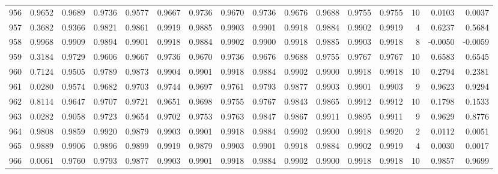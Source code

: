 \begin{tabular}{lrrrrrrrrrrrrrrr}
956 &      0.9652 &  0.9689 &  0.9736 &  0.9577 &  0.9667 &  0.9736 &  0.9670 &  0.9736 &  0.9676 &  0.9688 &   0.9755 &     0.9755 &     10 &                    0.0103 &                     0.0037 \\
957 &      0.3682 &  0.9366 &  0.9821 &  0.9861 &  0.9919 &  0.9885 &  0.9903 &  0.9901 &  0.9918 &  0.9884 &   0.9902 &     0.9919 &      4 &                    0.6237 &                     0.5684 \\
958 &      0.9968 &  0.9909 &  0.9894 &  0.9901 &  0.9918 &  0.9884 &  0.9902 &  0.9900 &  0.9918 &  0.9885 &   0.9903 &     0.9918 &      8 &                   -0.0050 &                    -0.0059 \\
959 &      0.3184 &  0.9729 &  0.9606 &  0.9667 &  0.9736 &  0.9670 &  0.9736 &  0.9676 &  0.9688 &  0.9755 &   0.9767 &     0.9767 &     10 &                    0.6583 &                     0.6545 \\
960 &      0.7124 &  0.9505 &  0.9789 &  0.9873 &  0.9904 &  0.9901 &  0.9918 &  0.9884 &  0.9902 &  0.9900 &   0.9918 &     0.9918 &     10 &                    0.2794 &                     0.2381 \\
961 &      0.0280 &  0.9574 &  0.9682 &  0.9703 &  0.9744 &  0.9697 &  0.9761 &  0.9793 &  0.9877 &  0.9903 &   0.9901 &     0.9903 &      9 &                    0.9623 &                     0.9294 \\
962 &      0.8114 &  0.9647 &  0.9707 &  0.9721 &  0.9651 &  0.9698 &  0.9755 &  0.9767 &  0.9843 &  0.9865 &   0.9912 &     0.9912 &     10 &                    0.1798 &                     0.1533 \\
963 &      0.0282 &  0.9058 &  0.9723 &  0.9654 &  0.9702 &  0.9753 &  0.9763 &  0.9847 &  0.9867 &  0.9911 &   0.9895 &     0.9911 &      9 &                    0.9629 &                     0.8776 \\
964 &      0.9808 &  0.9859 &  0.9920 &  0.9879 &  0.9903 &  0.9901 &  0.9918 &  0.9884 &  0.9902 &  0.9900 &   0.9918 &     0.9920 &      2 &                    0.0112 &                     0.0051 \\
965 &      0.9889 &  0.9906 &  0.9896 &  0.9899 &  0.9919 &  0.9879 &  0.9903 &  0.9901 &  0.9918 &  0.9884 &   0.9902 &     0.9919 &      4 &                    0.0030 &                     0.0017 \\
966 &      0.0061 &  0.9760 &  0.9793 &  0.9877 &  0.9903 &  0.9901 &  0.9918 &  0.9884 &  0.9902 &  0.9900 &   0.9918 &     0.9918 &     10 &                    0.9857 &                     0.9699 \\

\end{tabular}
